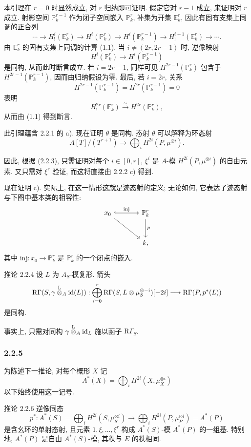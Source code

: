 本引理在 $r=0$ 时显然成立, 对 $r$ 归纳即可证明. 假定它对 $r-1$ 成立, 来证明对 $r$ 成立. 射影空间 $\mathbb P_k^{r-1}$ 作为闭子空间嵌入 $\mathbb P_k^r$, 补集为开集 $\mathbb E_k^r$, 因此有固有支集上同调的正合列
\[
\cdots\longrightarrow H_!^i(\mathbb E_k^r)\longrightarrow H^i(\mathbb P_k^r)
\longrightarrow H^i(\mathbb P_k^{r-1})\longrightarrow H_!^{i+1}(\mathbb E_k^r)\longrightarrow\cdots.
\]
由 $\mathbb E_k^r$ 的固有支集上同调的计算 (1.1), 当 $i\ne(2r,2r-1)$ 时, 逆像映射
\[
H^i(\mathbb P_k^r)\longrightarrow H^i(\mathbb P_k^{r-1})
\]
是同构, 从而此时断言成立. 若 $i=2r-1$, 同样可见 $H^{2r-1}(\mathbb P_k^r)$ 包含于 $H^{2r-1}(\mathbb P_k^{r-1})$, 因而由归纳假设为零. 最后, 若 $i=2r$, 关系
\[
H^{2r-1}(\mathbb P_k^{r-1})=H^{2r}(\mathbb P_k^{r-1})=0
\]
表明
\[
H_!^{2r}(\mathbb E_k^r)\xrightarrow{\sim}H^{2r}(\mathbb P_k^r),
\]
从而由 (1.1) 得到断言.

此引理蕴含 2.2.1 的 a). 现在证明 $\theta$ 是同构. 态射 $\theta$ 可以解释为环态射
\[
A[T]/(T^{r+1})\longrightarrow\bigoplus_i H^{2i}(P,\mu^{\otimes i}).
\]


因此, 根据 (2.2.3), 只需证明对每个 $i\in[0,r]$, $\xi^i$ 是 $A$-模 $H^{2i}(P,\mu^{\otimes i})$ 的自由元素. 又只需对 $\xi^r$ 验证, 而这将直接由 2.2.2 c) 得到.

现在证明 c). 实际上, 在这一情形这就是迹态射的定义; 无论如何, 它表达了迹态射与下图中基本类的相容性:
\[
\begin{tikzcd}[column sep=large,row sep=large]
x_0 \arrow[r,hook,"\mathrm{inj}"] \arrow[dr] & \mathbb P^r_k \arrow[d,"p"]\\
& k ,
\end{tikzcd}
\]
其中 $\mathrm{inj}:x_0\to \mathbb P^r_k$ 是 $\mathbb P^r_k$ 的一个闭点的嵌入.

\begin{statement}{推论 2.2.4}
设 $L$ 为 $A_S$-模复形. 箭头
\[
\mathrm R\Gamma(S,\gamma\overset{\mathrm L}{\otimes}_A\mathrm{id}(L)):
\bigoplus_{i=0}^r \mathrm R\Gamma(S,L\otimes\mu_S^{\otimes -i})[-2i]
\longrightarrow
\mathrm R\Gamma(P,p^*(L))
\]
是同构.
\end{statement}

事实上, 只需对同构 $\gamma\overset{\mathrm L}{\otimes}_A\mathrm{id}_L$ 施以函子 $\mathrm R\Gamma_S$.

\subsubsection*{2.2.5}
为陈述下一推论, 对每个概形 $X$ 记
\[
A^*(X)=\bigoplus_i H^{2i}(X,\mu_X^{\otimes i})
\]
以下始终使用这一记号.

\begin{statement}{推论 2.2.6}
逆像同态
\[
p^*:A^*(S)=\bigoplus_i H^{2i}(S,\mu_S^{\otimes i})
\longrightarrow
\bigoplus_i H^{2i}(P,\mu_P^{\otimes i})=A^*(P)
\]
是含幺环的单射态射, 且元素 $1,\xi,\ldots,\xi^r$ 构成 $A^*(S)$-模 $A^*(P)$ 的一组基. 特别地, $A^*(P)$ 是自由 $A^*(S)$-模, 其秩与 $E$ 的秩相同.
\end{statement}

